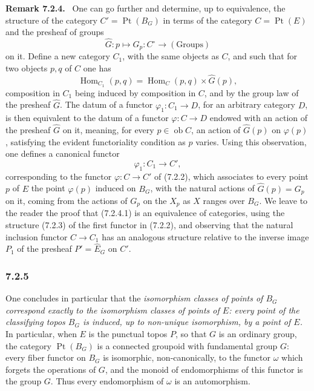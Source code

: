 \documentclass[11pt]{article}
\newcommand{\Hom}{\operatorname{Hom}}
\newcommand{\ob}{\operatorname{ob}}
\newcommand{\Ppoint}{\operatorname{Pt}}
\newenvironment{remarktext}[1]{\par\medskip\noindent\textbf{#1.}\ }{\par\medskip}
\begin{document}
\begin{remarktext}{Remark 7.2.4}
One can go further and determine, up to equivalence, the structure of the category \(C'=\Ppoint(B_G)\) in terms of the category \(C=\Ppoint(E)\) and the presheaf of groups
\[
\widehat G:p\longmapsto G_p:C^\circ\longrightarrow (\text{Groups})
\]
on it. Define a new category \(C_1\), with the same objects as \(C\), and such that for two objects \(p,q\) of \(C\) one has
\[
\Hom_{C_1}(p,q)=\Hom_C(p,q)\times\widehat G(p),
\]
composition in \(C_1\) being induced by composition in \(C\), and by the group law of the presheaf \(\widehat G\). The datum of a functor \(\varphi_1:C_1\to D\), for an arbitrary category \(D\), is then equivalent to the datum of a functor \(\varphi:C\to D\) endowed with an action of the presheaf \(\widehat G\) on it, meaning, for every \(p\in\ob C\), an action of \(\widehat G(p)\) on \(\varphi(p)\), satisfying the evident functoriality condition as \(p\) varies. Using this observation, one defines a canonical functor
\begin{equation*}
\varphi_1:C_1\longrightarrow C',\tag{7.2.4.1}
\end{equation*}
corresponding to the functor \(\varphi:C\to C'\) of (7.2.2), which associates to every point \(p\) of \(E\) the point \(\varphi(p)\) induced on \(B_G\), with the natural actions of \(\widehat G(p)=G_p\) on it, coming from the actions of \(G_p\) on the \(X_p\) as \(X\) ranges over \(B_G\). We leave to the reader the proof that (7.2.4.1) is an equivalence of categories, using the structure (7.2.3) of the first functor in (7.2.2), and observing that the natural inclusion functor \(C\to C_1\) has an analogous structure relative to the inverse image \(P_1\) of the presheaf \(P'=\widehat E_G\) on \(C'\).
\end{remarktext}

\subsubsection*{7.2.5}
One concludes in particular that the \emph{isomorphism classes of points of \(B_G\) correspond exactly to the isomorphism classes of points of \(E\): every point of the classifying topos \(B_G\) is induced, up to non-unique isomorphism, by a point of \(E\).} In particular, when \(E\) is the punctual topos \(P\), so that \(G\) is an ordinary group, the category \(\Ppoint(B_G)\) is a connected groupoid with fundamental group \(G\): every fiber functor on \(B_G\) is isomorphic, non-canonically, to the functor \(\omega\) which forgets the operations of \(G\), and the monoid of endomorphisms of this functor is the group \(G\). Thus every endomorphism of \(\omega\) is an automorphism.
\end{document}
